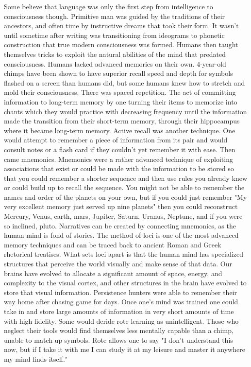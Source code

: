 \documentclass[a4paper,twoside,fontsize=12pt,pagesize=auto]{scrbook}
\begin{document}
Some believe that language was only the first step from intelligence to consciousness though. Primitive man was guided by the traditions of their ancestors, and often time by instructive dreams that took their form. It wasn't until sometime after writing was transitioning from ideograms to phonetic construction that true modern consciousness was formed. Humans then taught themselves tricks to exploit the natural abilities of the mind that predated consciousness. Humans lacked advanced memories on their own. 4\hyp{}year\hyp{}old chimps have been shown to have superior recall speed and depth for symbols flashed on a screen than humans did, but some humans knew how to stretch and mold their consciousness. There was spaced repetition. The act of committing information to long\hyp{}term memory by one turning their items to memorize into chants which they would practice with decreasing frequency until the information made the transition from their short\hyp{}term memory, through their hippocampus where it became long\hyp{}term memory. Active recall was another technique. One would attempt to remember a piece of information from its pair and would consult notes or a flash card if they couldn't yet remember it with ease. Then came mnemonics. Mnemonics were a rather advanced technique of exploiting associations that exist or could be made with the information to be stored so that you could remember a shorter sequence and then use rules you already knew or could build up to recall the sequence. You might not be able to remember the names and order of the planets on your own, but if you could just remember "My very excellent memory just served up nine planets" then you could reconstruct Mercury, Venus, earth, mars, Jupiter, Saturn, Uranus, Neptune, and if you were so inclined, pluto. Narratives can be created by connecting mnemonics, as the human mind is fond of stories. The method of loci is one of the most advanced memory techniques and can be traced back to ancient Roman and Greek rhetorical treatises. What sets loci apart is that the human mind has specialized structures that perceive the world visually and make sense of that data. Our brains have evolved to allocate a significant amount of space, energy, and complexity to the visual cortex, and other structures in the brain have evolved to store that visual information. Persistence hunters were able to remember their way home after chasing game for days. Once one's mind was trained one could take in and store large amounts of information in very short amounts of time with high fidelity. Some would deride rote learning as unintelligent. Those who neglect their tools would find themselves less mentally capable than a chimp, unable to match up symbols. Rote allows one to say "I don't understand this now, but if I take it with me I can study it at my leisure and master it anywhere my mind finds itself."
\end{document}
